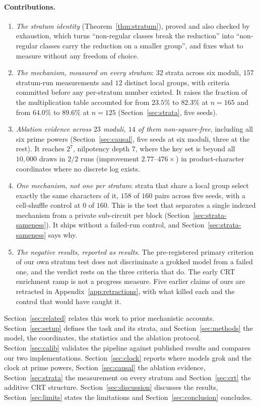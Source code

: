 \paragraph{Contributions.}
\begin{enumerate}
  \item \emph{The stratum identity} (Theorem~\ref{thm:stratum}), proved and also
    checked by exhaustion, which
    turns ``non-regular classes break the reduction'' into ``non-regular classes carry the
    reduction on a smaller group'', and fixes what to measure without any freedom of choice.
  \item \emph{The mechanism, measured on every stratum}: $32$ strata across six moduli, $157$
    stratum-run measurements and $12$ distinct local groups, with criteria committed before any
    per-stratum number existed. It raises the fraction of the multiplication table accounted
    for from $23.5\%$ to $82.3\%$ at $n = 165$ and from $64.0\%$ to $89.6\%$ at $n = 125$
    (Section~\ref{sec:strata}, five seeds).
  \item \emph{Ablation evidence across $23$ moduli, $14$ of them non-square-free}, including
    all six prime powers (Section~\ref{sec:causal}, five seeds at six moduli, three at the
    rest). It reaches $2^{7}$, nilpotency depth $7$, where the key set is beyond all
    $10{,}000$ draws in $2/2$ runs (improvement $2.77$--$476\times$) in product-character
    coordinates where no discrete log exists.
  \item \emph{One mechanism, not one per stratum}: strata that share a local group select
    exactly the same characters of it, $158$ of $160$ pairs across five seeds, with a
    cell-shuffle control at $0$ of $160$. This is the test that separates a single indexed
    mechanism from a private sub-circuit per block (Section~\ref{sec:strata-sameness}). It
    ships without a failed-run control, and Section~\ref{sec:strata-sameness} says why.
  \item \emph{The negative results, reported as results}. The pre-registered primary
    criterion of our own stratum test does not discriminate a grokked model from a failed one,
    and the verdict rests on the three criteria that do. The early CRT enrichment ramp is not a
    progress measure. Five earlier claims of ours are retracted in
    Appendix~\ref{app:retractions}, with what killed each and the control that would have
    caught it.
\end{enumerate}

Section~\ref{sec:related} relates this work to prior mechanistic accounts.
Section~\ref{sec:setup} defines the task and its strata, and Section~\ref{sec:methods} the
model, the coordinates, the statistics and the ablation protocol. Section~\ref{sec:calib}
validates the pipeline against published results and compares our two implementations.
Section~\ref{sec:clock} reports where models grok and the clock at prime powers,
Section~\ref{sec:causal} the ablation evidence, Section~\ref{sec:strata} the measurement on
every stratum and Section~\ref{sec:crt} the additive CRT structure.
Section~\ref{sec:discussion} discusses the results, Section~\ref{sec:limits} states the
limitations and Section~\ref{sec:conclusion} concludes.
